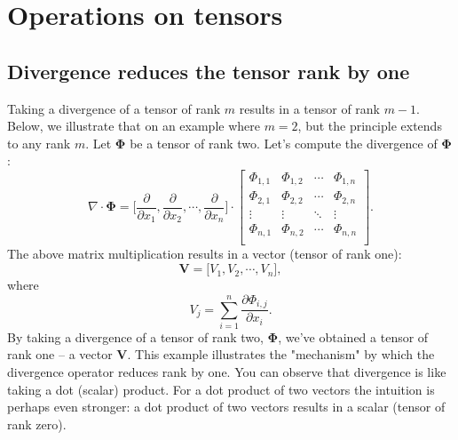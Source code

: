 \documentclass[10pt,twocolumn]{article}
\begin{document}







\section*{Operations on tensors}

\subsection*{Divergence reduces the tensor rank by one}

Taking a divergence of a tensor of rank $m$ results in a tensor of rank $m-1$. Below, we illustrate that on an example where $m=2$, but the principle extends to any rank $m$. Let $\pmb{\Phi}$ be a tensor of rank two. Let's compute the divergence of $\pmb{\Phi}$:
\begin{equation*}
  \nabla \cdot \pmb{\Phi} =
  \Big[ \frac{\partial}{\partial x_1} , \frac{\partial}{\partial x_2}, \cdots , \frac{\partial}{\partial x_n} \Big]
  \cdot
  \begin{bmatrix}
  \Phi_{1,1} & \Phi_{1,2} & \cdots & \Phi_{1,n} \\
  \Phi_{2,1} & \Phi_{2,2} & \cdots & \Phi_{2,n}\\
  \vdots & \vdots & \ddots & \vdots \\
   \Phi_{n,1} & \Phi_{n,2} & \cdots & \Phi_{n,n} \\
  \end{bmatrix}.
\end{equation*}
The above matrix multiplication results in a vector (tensor of rank one):
\begin{equation*}
\mathbf{V} =  \Big[V_1, V_2, \cdots ,  V_n \Big] ,
\end{equation*}
where
\begin{equation*}
V_j = \sum_{i=1}^n \frac{\partial \Phi_{i,j}}{\partial x_i}.
\end{equation*}
By taking a divergence of a tensor of rank two, $\pmb{\Phi}$, we've obtained a tensor of rank one -- a vector $\mathbf{V}$. This example  illustrates the "mechanism" by which the divergence operator reduces rank by one. You can observe that divergence is like taking a dot (scalar) product. For a dot product of two vectors the intuition is perhaps even stronger: a dot product of two vectors results in a scalar (tensor of rank zero). 
\end{document}
